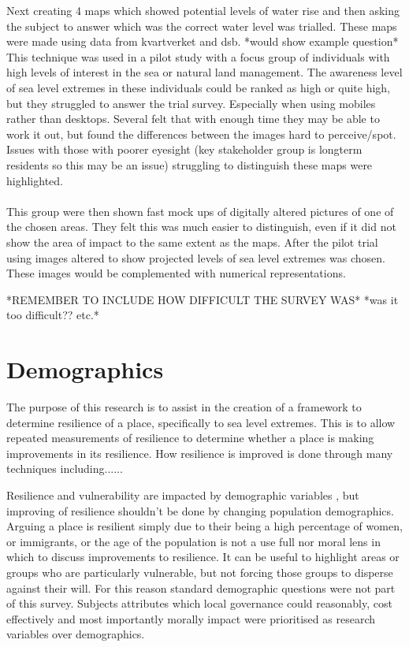 Next creating 4 maps which showed potential levels of water rise and then asking the subject to answer which was the correct water level was trialled. These maps were made using data from kvartverket and dsb. *would show example question*
This technique was used in a pilot study with a focus group of individuals with high levels of interest in the sea or natural land management. The awareness level of sea level extremes in these individuals could be ranked as high or quite high, but they struggled to answer the trial survey. Especially when using mobiles rather than desktops. Several felt that with enough time they may be able to work it out, but found the differences between the images hard to perceive/spot. Issues with those with poorer eyesight (key stakeholder group is longterm residents so this may be an issue) struggling to distinguish these maps were highlighted.
\paragraph{}

This group were then shown fast mock ups of digitally altered pictures of one of the chosen areas. They felt this was much easier to distinguish, even if it did not show the area of impact to the same extent as the maps. 
After the pilot trial using images altered to show projected levels of sea level extremes was chosen. These images would be complemented with numerical representations. 

*REMEMBER TO INCLUDE HOW DIFFICULT THE SURVEY WAS*
*was it too difficult?? etc.*

\section{Demographics}
The purpose of this research is to assist in the creation of a framework to determine resilience of a place, specifically to sea level extremes. This is to allow repeated measurements of resilience to determine whether a place is making improvements in its resilience. How resilience is improved is done through many techniques including......

Resilience and vulnerability are impacted by demographic variables \cite{rod_integrated_2012}, but improving of resilience shouldn't be done by changing population demographics. Arguing a place is resilient simply due to their being a high percentage of women, or immigrants, or the age of the population is not a use full nor moral lens in which to discuss improvements to resilience. It can be useful to highlight areas or groups who are particularly vulnerable, but not forcing those groups to disperse against their will. For this reason standard demographic questions were not part of this survey. Subjects attributes which local governance could reasonably, cost effectively and most importantly morally impact were prioritised as research variables over demographics. 

